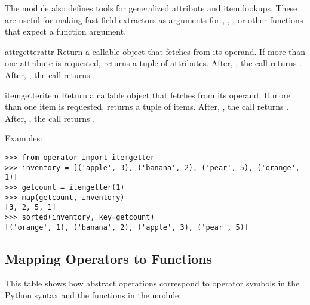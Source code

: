 The  module also defines tools for generalized attribute
and item lookups.  These are useful for making fast field extractors
as arguments for , ,
, or other functions that expect a
function argument.

\begin{funcdesc}{attrgetter}{attr}
Return a callable object that fetches  from its operand.
If more than one attribute is requested, returns a tuple of attributes.
After, , the call  returns
.  After, , the call
 returns . 
\end{funcdesc}
    
\begin{funcdesc}{itemgetter}{item}
Return a callable object that fetches  from its operand.
If more than one item is requested, returns a tuple of items.
After, , the call  returns
.
After, , the call  returns
.		
\end{funcdesc}

Examples:
                
\begin{verbatim}
>>> from operator import itemgetter
>>> inventory = [('apple', 3), ('banana', 2), ('pear', 5), ('orange', 1)]
>>> getcount = itemgetter(1)
>>> map(getcount, inventory)
[3, 2, 5, 1]
>>> sorted(inventory, key=getcount)
[('orange', 1), ('banana', 2), ('apple', 3), ('pear', 5)]
\end{verbatim}
                

\subsection{Mapping Operators to Functions \label{operator-map}}

This table shows how abstract operations correspond to operator
symbols in the Python syntax and the functions in the
 module.


